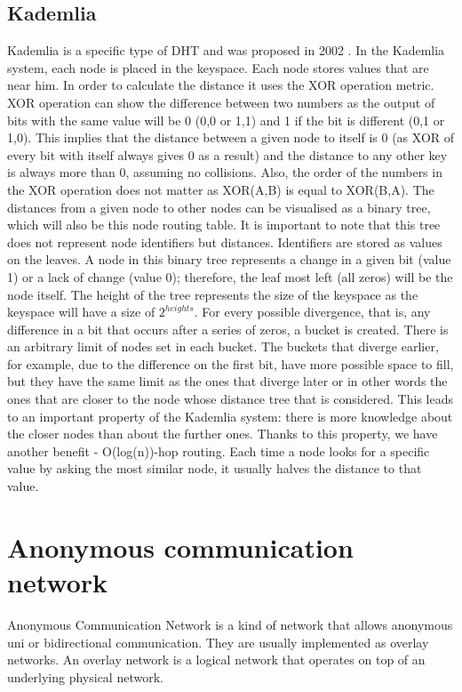 \subsection{Kademlia}
Kademlia is a specific type of DHT and was proposed in 2002 \cite{kademlia}. In the Kademlia system, each node is placed in the keyspace. Each node stores values that are near him. In order to calculate the distance it uses the XOR operation metric. XOR operation can show the difference between two numbers as the output of bits with the same value will be 0 (0,0 or 1,1)  and 1 if the bit is different (0,1 or 1,0). This implies that the distance between a given node to itself is 0 (as XOR of every bit with itself always gives 0 as a result) and the distance to any other key is always more than 0, assuming no collisions. Also, the order of the numbers in the XOR operation does not matter as XOR(A,B) is equal to XOR(B,A).
The distances from a given node to other nodes can be visualised as a binary tree, which will also be this node routing table. It is important to note that this tree does not represent node identifiers but distances. Identifiers are stored as values on the leaves. A node in this binary tree represents a change in a given bit (value 1) or a lack of change (value 0); therefore, the leaf most left (all zeros) will be the node itself. The height of the tree represents the size of the keyspace as the keyspace will have a size of $2^{heights}$.
For every possible divergence, that is, any difference in a bit that occurs after a series of zeros, a bucket is created. There is an arbitrary limit of nodes set in each bucket. The buckets that diverge earlier, for example, due to the difference on the first bit, have more possible space to fill, but they have the same limit as the ones that diverge later or in other words the ones that are closer to the node whose distance tree that is considered. This leads to an important property of the Kademlia system: there is more knowledge about the closer nodes than about the further ones. Thanks to this property, we have another benefit - O(log(n))-hop routing. Each time a node looks for a specific value by asking the most similar node, it usually halves the distance to that value.


\section{Anonymous communication network}
Anonymous Communication Network is a kind of network that allows anonymous uni or bidirectional communication. They are usually implemented as overlay networks. An overlay network is a logical network that operates on top of an underlying physical network.


